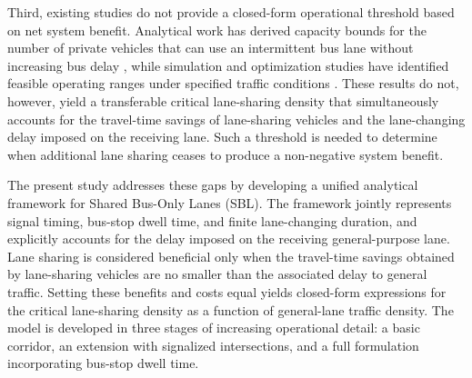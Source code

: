 Third, existing studies do not provide a closed-form operational threshold based on net system benefit. Analytical work has derived capacity bounds for the number of private vehicles that can use an intermittent bus lane without increasing bus delay \citep{lin2022capability}, while simulation and optimization studies have identified feasible operating ranges under specified traffic conditions \citep{xie2023modelling,wu2017evaluating,othman2023dynamic}. These results do not, however, yield a transferable critical lane-sharing density that simultaneously accounts for the travel-time savings of lane-sharing vehicles and the lane-changing delay imposed on the receiving lane. Such a threshold is needed to determine when additional lane sharing ceases to produce a non-negative system benefit.

The present study addresses these gaps by developing a unified analytical framework for Shared Bus-Only Lanes (SBL). The framework jointly represents signal timing, bus-stop dwell time, and finite lane-changing duration, and explicitly accounts for the delay imposed on the receiving general-purpose lane. Lane sharing is considered beneficial only when the travel-time savings obtained by lane-sharing vehicles are no smaller than the associated delay to general traffic. Setting these benefits and costs equal yields closed-form expressions for the critical lane-sharing density as a function of general-lane traffic density. The model is developed in three stages of increasing operational detail: a basic corridor, an extension with signalized intersections, and a full formulation incorporating bus-stop dwell time.
